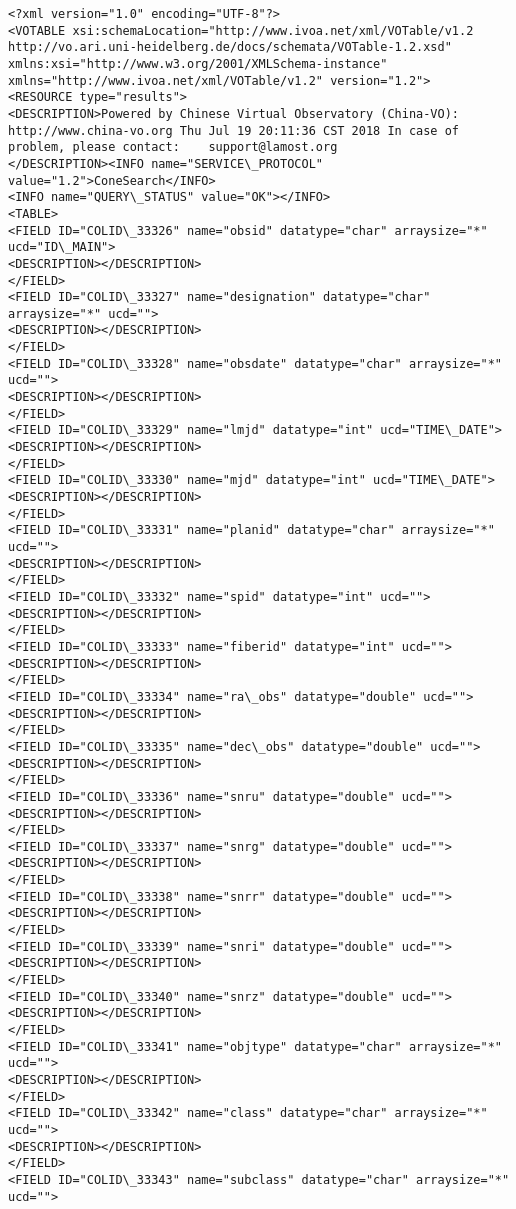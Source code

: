 \documentclass[11pt]{article}
\begin{document}
    \begin{Verbatim}[commandchars=\\\{\}]
<?xml version="1.0" encoding="UTF-8"?>
<VOTABLE xsi:schemaLocation="http://www.ivoa.net/xml/VOTable/v1.2 http://vo.ari.uni-heidelberg.de/docs/schemata/VOTable-1.2.xsd" xmlns:xsi="http://www.w3.org/2001/XMLSchema-instance" xmlns="http://www.ivoa.net/xml/VOTable/v1.2" version="1.2">
<RESOURCE type="results">
<DESCRIPTION>Powered by Chinese Virtual Observatory (China-VO): http://www.china-vo.org Thu Jul 19 20:11:36 CST 2018 In case of problem, please contact:	support@lamost.org
</DESCRIPTION><INFO name="SERVICE\_PROTOCOL" value="1.2">ConeSearch</INFO>
<INFO name="QUERY\_STATUS" value="OK"></INFO>
<TABLE>
<FIELD ID="COLID\_33326" name="obsid" datatype="char" arraysize="*" ucd="ID\_MAIN">
<DESCRIPTION></DESCRIPTION>
</FIELD>
<FIELD ID="COLID\_33327" name="designation" datatype="char" arraysize="*" ucd="">
<DESCRIPTION></DESCRIPTION>
</FIELD>
<FIELD ID="COLID\_33328" name="obsdate" datatype="char" arraysize="*" ucd="">
<DESCRIPTION></DESCRIPTION>
</FIELD>
<FIELD ID="COLID\_33329" name="lmjd" datatype="int" ucd="TIME\_DATE">
<DESCRIPTION></DESCRIPTION>
</FIELD>
<FIELD ID="COLID\_33330" name="mjd" datatype="int" ucd="TIME\_DATE">
<DESCRIPTION></DESCRIPTION>
</FIELD>
<FIELD ID="COLID\_33331" name="planid" datatype="char" arraysize="*" ucd="">
<DESCRIPTION></DESCRIPTION>
</FIELD>
<FIELD ID="COLID\_33332" name="spid" datatype="int" ucd="">
<DESCRIPTION></DESCRIPTION>
</FIELD>
<FIELD ID="COLID\_33333" name="fiberid" datatype="int" ucd="">
<DESCRIPTION></DESCRIPTION>
</FIELD>
<FIELD ID="COLID\_33334" name="ra\_obs" datatype="double" ucd="">
<DESCRIPTION></DESCRIPTION>
</FIELD>
<FIELD ID="COLID\_33335" name="dec\_obs" datatype="double" ucd="">
<DESCRIPTION></DESCRIPTION>
</FIELD>
<FIELD ID="COLID\_33336" name="snru" datatype="double" ucd="">
<DESCRIPTION></DESCRIPTION>
</FIELD>
<FIELD ID="COLID\_33337" name="snrg" datatype="double" ucd="">
<DESCRIPTION></DESCRIPTION>
</FIELD>
<FIELD ID="COLID\_33338" name="snrr" datatype="double" ucd="">
<DESCRIPTION></DESCRIPTION>
</FIELD>
<FIELD ID="COLID\_33339" name="snri" datatype="double" ucd="">
<DESCRIPTION></DESCRIPTION>
</FIELD>
<FIELD ID="COLID\_33340" name="snrz" datatype="double" ucd="">
<DESCRIPTION></DESCRIPTION>
</FIELD>
<FIELD ID="COLID\_33341" name="objtype" datatype="char" arraysize="*" ucd="">
<DESCRIPTION></DESCRIPTION>
</FIELD>
<FIELD ID="COLID\_33342" name="class" datatype="char" arraysize="*" ucd="">
<DESCRIPTION></DESCRIPTION>
</FIELD>
<FIELD ID="COLID\_33343" name="subclass" datatype="char" arraysize="*" ucd="">

\end{Verbatim}
\end{document}
